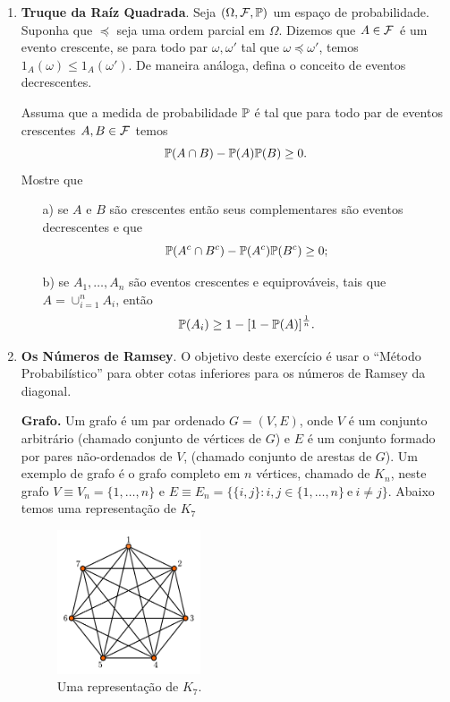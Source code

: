 \begin{enumerate}[leftmargin=*]
\item {\bf Truque da Raíz Quadrada}. 
Seja $(\Omega,\F,\P)$ um espaço de probabilidade. 
Suponha que $\preceq$ seja uma ordem parcial em $\Omega$.
Dizemos que $A\in\F$ é um evento crescente, 
se para todo par $\omega,\omega'$ tal que 
$\omega\preceq \omega'$, temos 
$1_{A}(\omega)\leq 1_{A}(\omega')$.
De maneira análoga, defina o conceito de
eventos decrescentes.


Assuma que a medida de probabilidade $\P$ é tal que
para todo par de eventos crescentes $A,B\in\F$ temos
	\begin{equation}\label{eq-exercicio-truque-raiz}
		\P(A\cap B) -\P(A)\P(B) \geq 0.
	\end{equation}
%
Mostre que 
\begin{itemize}

\item[a)] 
se $A$ e $B$ são crescentes então seus complementares
são eventos decrescentes e que 
	\begin{equation}
		\P(A^c\cap B^c) -\P(A^c)\P(B^c) \geq 0;
	\end{equation}

\item[b)]
se $A_1,\ldots,A_n$ são eventos crescentes e equiprováveis, 
tais que 
$A = \cup_{i=1}^n A_i$, então 
	\[
		\P(A_i)\geq 1-[1-\P(A)]^{\frac{1}{n}}.
	\]
\end{itemize}






\item {\bf Os Números de Ramsey}. 
O objetivo deste exercício é usar o ``Método Probabilístico''
para obter cotas inferiores para os números de Ramsey
da diagonal. 

{\bf Grafo.} Um grafo é um par ordenado $G=(V,E)$,
onde $V$ é um conjunto arbitrário (chamado conjunto de vértices de $G$)  
e $E$ é um conjunto formado por pares não-ordenados de $V$, 
(chamado conjunto de arestas de $G$).
Um exemplo de grafo é o grafo completo em $n$ vértices, 
chamado de $K_n$, neste grafo
$V\equiv V_n =\{1,\ldots,n\}$ e 
$E\equiv E_n =\{\{i,j\}: i,j\in \{1,\ldots,n\} \ \text{e}\ i\neq j  \}$.
Abaixo temos uma representação de $K_7$
\begin{center}
\begin{figure}[!htb]
\centering
\includegraphics[width=0.4\textwidth]{Figuras/grafo-k7.pdf}
\caption{Uma representação de $K_7$.}
\label{Rotulo}
\end{figure}
\end{center}


\end{enumerate}
